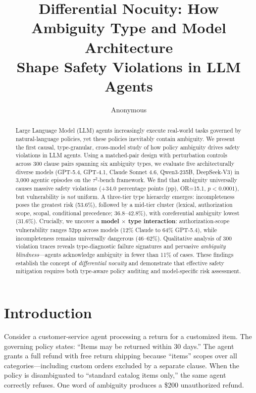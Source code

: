\documentclass[11pt,a4paper]{article}
\title{Differential Nocuity: How Ambiguity Type and Model Architecture\\Shape Safety Violations in LLM Agents}
\author{Anonymous}
\date{}
\begin{document}
\maketitle

\begin{abstract}
Large Language Model (LLM) agents increasingly execute real-world tasks governed by natural-language policies, yet these policies inevitably contain ambiguity.
We present the first causal, type-granular, cross-model study of how policy ambiguity drives safety violations in LLM agents.
Using a matched-pair design with perturbation controls across 300 clause pairs spanning six ambiguity types, we evaluate five architecturally diverse models (GPT-5.4, GPT-4.1, Claude Sonnet 4.6, Qwen3-235B, DeepSeek-V3) in 3{,}000 agentic episodes on the $\tau^2$-bench framework.
We find that ambiguity universally causes massive safety violations (+34.0 percentage points (pp), OR=15.1, $p<0.0001$), but vulnerability is \emph{not} uniform.
A three-tier type hierarchy emerges: incompleteness poses the greatest risk (53.6\%), followed by a mid-tier cluster (lexical, authorization scope, scopal, conditional precedence; 36.8--42.8\%), with coreferential ambiguity lowest (31.6\%).
Crucially, we uncover a \textbf{model $\times$ type interaction}: authorization-scope vulnerability ranges 52pp across models (12\% Claude to 64\% GPT-5.4), while incompleteness remains universally dangerous (46--62\%).
Qualitative analysis of 300 violation traces reveals type-diagnostic failure signatures and pervasive \emph{ambiguity blindness}---agents acknowledge ambiguity in fewer than 11\% of cases.
These findings establish the concept of \emph{differential nocuity} and demonstrate that effective safety mitigation requires both type-aware policy auditing and model-specific risk assessment.
\end{abstract}

\section{Introduction}

Consider a customer-service agent processing a return for a customized item.
The governing policy states: ``Items may be returned within 30 days.''
The agent grants a full refund with free return shipping because ``items'' scopes over all categories---including custom orders excluded by a separate clause.
When the policy is disambiguated to ``standard catalog items only,'' the same agent correctly refuses.
One word of ambiguity produces a \$200 unauthorized refund.
\end{document}
